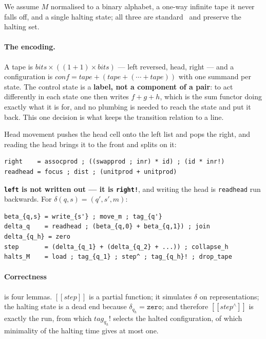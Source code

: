 \documentclass[runningheads,envcountsame]{llncs}
\newcommand{\den}[1]{\ensuremath{[\![#1]\!]}}
\newcommand{\clo}{\ensuremath{^{\wedge}}}
\begin{document}
We assume $M$ normalised to a binary alphabet, a one-way infinite tape it never
falls off, and a single halting state; all three are standard~\cite{hopcroft} and
preserve the halting set.

\paragraph{The encoding.} A tape is
$\mathit{bits} \times ((1+1) \times \mathit{bits})$ --- left reversed, head, right
--- and a configuration is
$\mathit{conf} = \mathit{tape} + (\mathit{tape} + (\cdots + \mathit{tape}))$ with
one summand per state. The control state is a \textbf{label, not a component of a
pair}: to act differently in each state one then writes $f + g + h$, which is the
sum functor doing exactly what it is for, and no plumbing is needed to reach the
state and put it back. This one decision is what keeps the transition relation to a
line.

Head movement pushes the head cell onto the left list and pops the right, and
reading the head brings it to the front and splits on it:

\begin{lstlisting}
right    = assocprod ; ((swapprod ; inr) * id) ; (id * inr!)
readhead = focus ; dist ; (unitprod + unitprod)
\end{lstlisting}

\noindent\textbf{\texttt{left} is not written out --- it is \texttt{right!}}, and
writing the head is \texttt{readhead} run backwards. For
$\delta(q,s) = (q',s',m)$:

\begin{lstlisting}
beta_{q,s} = write_{s'} ; move_m ; tag_{q'}
delta_q    = readhead ; (beta_{q,0} + beta_{q,1}) ; join     delta_{q_h} = zero
step       = (delta_{q_1} + (delta_{q_2} + ...)) ; collapse_h
halts_M    = load ; tag_{q_1} ; step^ ; tag_{q_h}! ; drop_tape
\end{lstlisting}

\paragraph{Correctness} is four lemmas. $\den{\mathit{step}}$ is a partial function;
it simulates $\delta$ on representations; the halting state is a dead end because
$\delta_{q_h} = \texttt{zero}$; and therefore $\den{\mathit{step}\clo}$ is
exactly the run, from which $\mathit{tag}_{q_h}!$ selects the halted configuration,
of which minimality of the halting time gives at most one.
\end{document}
